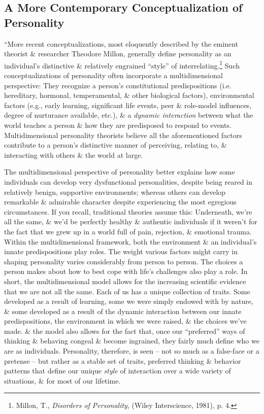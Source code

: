 \documentclass{article}
\numberwithin{equation}{section}
\begin{document}
\subsection*{A More Contemporary Conceptualization of Personality}
``More recent conceptualizations, most eloquently described by the eminent theorist \& researcher Theodore Millon, generally define personality as an individual's distinctive \& relatively engrained ``style'' of interrelating.\footnote{Millon, T., \textit{Disorders of Personality}, (Wiley Interscience, 1981), p. 4.} Such conceptualizations of personality often incorporate a multidimensional perspective: They recognize a person's constitutional predispositions (i.e. hereditary, hormonal, temperamental, \& other biological factors), environmental factors (e.g., early learning, significant life events, peer \& role-model influences, degree of nurturance available, etc.), \& a \textit{dynamic interaction} between what the world teaches a person \& how they are predisposed to respond to events. Multidimensional personality theorists believe all the aforementioned factors contribute to a person's distinctive manner of perceiving, relating to, \& interacting with others \& the world at large.

The multidimensional perspective of personality better explains how some individuals can develop very dysfunctional personalities, despite being reared in relatively benign, supportive environments; whereas others can develop remarkable \& admirable character despite experiencing the most egregious circumstances. If you recall, traditional theories assume this: Underneath, we're all the same, \& we'd be perfectly healthy \& authentic individuals if it weren't for the fact that we grew up in a world full of pain, rejection, \& emotional trauma. Within the multidimensional framework, both the environment \& an individual's innate predispositions play roles. The weight various factors might carry in shaping personality varies considerably from person to person. The choices a person makes about how to best cope with life's challenges also play a role. In short, the multidimensional model allows for the increasing scientific evidence that we are not all the same. Each of us has a unique collection of traits. Some developed as a result of learning, some we were simply endowed with by nature, \& some developed as a result of the dynamic interaction between our innate predispositions, the environment in which we were raised, \& the choices we've made. \& the model also allows for the fact that, once our ``preferred'' ways of thinking \& behaving congeal \& become ingrained, they fairly much define who we are as individuals. Personality, therefore, is seen -- not so much as a false-face or a pretense -- but rather as a stable set of traits, preferred thinking \& behavior patterns that define our unique \textit{style} of interaction over a wide variety of situations, \& for most of our lifetime.
\end{document}
